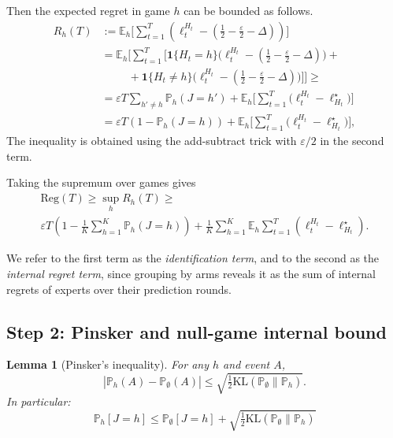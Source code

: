 \documentclass[a4paper,14pt]{extarticle}
\theoremstyle{plain}
\newtheorem{lemma}{Lemma}
\begin{document}
Then the expected regret in game $h$ can be bounded as follows.
\begin{align}
    R_h(T) &:= \mathbb{E}_h \bigg[\sum_{t=1}^T(\ell_t^{H_t} - (\frac{1}{2} - \frac{\varepsilon}{2} - \Delta))\bigg] \\
    & =\mathbb{E}_h \bigg[\sum_{t=1}^T\bigg[\mathbf{1}\{H_t=h\} \bigg(\ell_t^{H_t} - (\frac{1}{2} - \frac{\varepsilon}{2} - \Delta)\bigg) +\\
    &~~~~~~~~~~~+\mathbf{1}\{H_t\ne h\}\bigg(\ell_t^{H_t}- (\frac{1}{2} - \frac{\varepsilon}{2} - \Delta)\bigg)  \bigg]\bigg] \ge \\
    &=\varepsilon T \sum_{h' \ne h} \mathbb P_h(J = h') + \mathbb{E}_h \bigg[\sum_{t=1}^T\bigg(\ell_t^{H_t} - \ell^\star_{H_t}\bigg)\bigg] \\
    & =
    \varepsilon T(1 - \mathbb{P}_h(J=h)) + \mathbb{E}_h \bigg[\sum_{t=1}^T\bigg(\ell_t^{H_t} - \ell^\star_{H_t}\bigg)\bigg],
\end{align}
The inequality is obtained using the add-subtract trick with ${\varepsilon}/2$ in the second term.


Taking the supremum over games gives
\begin{multline}
\label{eq:bandit-regret-prob}
\text{Reg}(T) \ge \sup_h R_h(T)
\ge \\
\varepsilon T \left( 1 - \frac{1}{K}\sum_{h=1}^K \mathbb{P}_h(J = h)\right)
+ \frac{1}{K}\sum_{h=1}^K \mathbb{E}_h\sum_{t=1}^T ( \ell_t^{H_t} - \ell_{H_t}^\star).
\end{multline}

We refer to the first term as the \emph{identification term},
and to the second as the \emph{internal regret term},
since grouping by arms reveals it as the sum of internal regrets of experts over their prediction rounds.



\subsection{Step 2: Pinsker and null-game internal bound}

\begin{lemma}[Pinsker's inequality]
\label{lem:pinsker}
For any $h$ and event $A$,
\begin{equation}
|\mathbb{P}_h(A) - \mathbb{P}_\emptyset(A)| \le \sqrt{\tfrac{1}{2}\mathrm{KL}(\mathbb{P}_\emptyset\|\mathbb{P}_h)}.
\end{equation}
In particular:
\begin{equation}
    \mathbb{P}_h[J=h] \le \mathbb{P}_\emptyset[J = h] + \sqrt{\tfrac{1}{2}\mathrm{KL}(\mathbb{P}_\emptyset\|\mathbb{P}_h)}
\end{equation}
\end{lemma}
\end{document}
